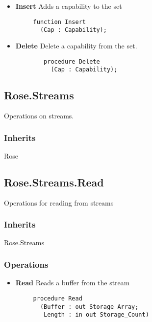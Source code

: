 \begin{itemize}
    \item \textbf{Insert} Adds a capability to the set
    
    \begin{verbatim}
     function Insert
       (Cap : Capability);    
    \end{verbatim}
    
    \item \textbf{Delete} Delete a capability from the set.
    
    \begin{verbatim}
        procedure Delete
          (Cap : Capability);
    \end{verbatim}

\end{itemize}

\subsection{Rose.Streams}

Operations on streams.

\subsubsection{Inherits}

Rose

\subsection{Rose.Streams.Read}

Operations for reading from streams

\subsubsection{Inherits}

Rose.Streams

\subsubsection{Operations}

\begin{itemize}
    \item \textbf{Read} Reads a buffer from the stream
    
    \begin{verbatim}
     procedure Read
       (Buffer : out Storage_Array;
        Length : in out Storage_Count)
    \end{verbatim}
\end{itemize}

